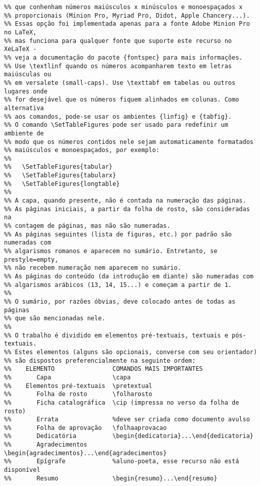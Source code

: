 \begin{verbatim}
%% que conhenham números maiúsculos x minúsculos e monoespaçados x
%% proporcionais (Minion Pro, Myriad Pro, Didot, Apple Chancery...).
%% Essas opção foi implementada apenas para a fonte Adobe Minion Pro no LaTeX,
%% mas funciona para qualquer fonte que suporte este recurso no XeLaTeX -
%% veja a documentação do pacote {fontspec} para mais informações.
%% Use \textlinf quando os números acompanharem texto em letras maiúsculas ou
%% em versalete (small-caps). Use \texttabf em tabelas ou outros lugares onde
%% for desejável que os números fiquem alinhados em colunas. Como alternativa
%% aos comandos, pode-se usar os ambientes {linfig} e {tabfig}.
%% O comando \SetTableFigures pode ser usado para redefinir um ambiente de
%% modo que os números contidos nele sejam automaticamente formatados
%% maiúsculos e monoespaçados, por exemplo: 
%%
%%   \SetTableFigures{tabular}
%%   \SetTableFigures{tabularx}
%%   \SetTableFigures{longtable}
%%
%% A capa, quando presente, não é contada na numeração das páginas.
%% As páginas iniciais, a partir da folha de rosto, são consideradas na 
%% contagem de páginas, mas não são numeradas.
%% As páginas seguintes (lista de figuras, etc.) por padrão são numeradas com
%% algarismos romanos e aparecem no sumário. Entretanto, se prestyle=empty,
%% não recebem numeração nem aparecem no sumário. 
%% As páginas do conteúdo (da introdução em diante) são numeradas com 
%% algarismos arábicos (13, 14, 15...) e começam a partir de 1.
%%
%% O sumário, por razões óbvias, deve colocado antes de todas as páginas
%% que são mencionadas nele.
%%
%% O trabalho é dividido em elementos pré-textuais, textuais e pós-textuais.
%% Estes elementos (alguns são opcionais, converse com seu orientador)
%% são dispostos preferencialmente na seguinte ordem:
%%    ELEMENTO                COMANDOS MAIS IMPORTANTES
%%       Capa                 \capa
%%    Elementos pré-textuais  \pretextual
%%       Folha de rosto       \folharosto
%%       Ficha catalográfica  \cip (impressa no verso da folha de rosto)
%%       Errata               %deve ser criada como documento avulso
%%       Folha de aprovação   \folhaaprovacao
%%       Dedicatória          \begin{dedicatoria}...\end{dedicatoria}
%%       Agradecimentos       \begin{agradecimentos}...\end{agradecimentos}
%%       Epígrafe             %aluno-poeta, esse recurso não está disponível
%%       Resumo               \begin{resumo}...\end{resumo}

\end{verbatim}
